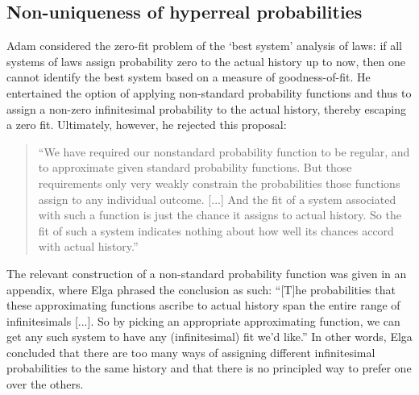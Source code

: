 \subsection{Non-uniqueness of hyperreal probabilities}
Adam \citet{Elga:2004} considered the zero-fit problem of the `best system' analysis of laws: if all systems of laws assign probability zero to the actual history up to now, then one cannot identify the best system based on a measure of goodness-of-fit. He entertained the option of applying non-standard probability functions and thus to assign a non-zero infinitesimal probability to the actual history, thereby escaping a zero fit. Ultimately, however, he rejected this proposal:
\begin{quote}
``We have required our nonstandard probability function to be regular, and to approximate given standard probability functions. But those requirements only very weakly constrain the probabilities those functions assign to any individual outcome. [...] And the fit of a system associated with such a function is just the chance it assigns to actual history. So the fit of such a system indicates nothing about how well its chances accord with actual history.''
\end{quote}
The relevant construction of a non-standard probability function was given in an appendix, where Elga phrased the conclusion as such:
``[T]he probabilities that these approximating functions ascribe to actual history span the entire range of infinitesimals [...]. So by picking an appropriate approximating function, we can get any such system to have any (infinitesimal) fit we'd like.''
In other words, Elga concluded that there are too many ways of assigning different infinitesimal probabilities to the same history and that there is no principled way to prefer one over the others.

